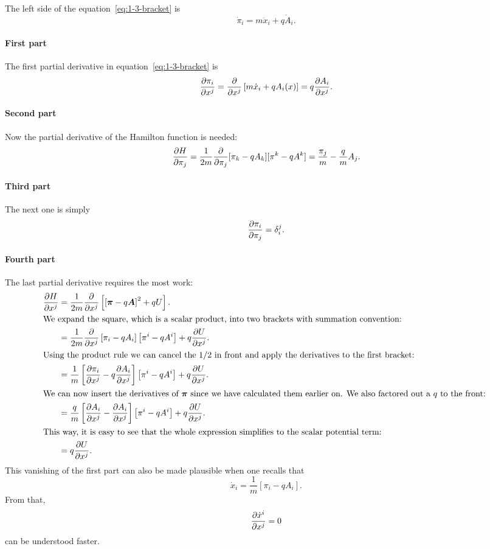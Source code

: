 \documentclass[11pt, english, fleqn, DIV=15, headinclude, BCOR=1cm]{scrartcl}
\begin{document}
The left side of the equation~\eqref{eq:1-3-bracket} is
\[
    \dot \pi_i = m \ddot x_i + q \dot A_i.
\]

\paragraph{First part}

The first partial derivative in equation~\eqref{eq:1-3-bracket} is
\[
    \frac{\partial {\pi_i}}{\partial {x^j}} = \frac{\partial {}}{\partial {x^j}} \left[ m \dot x_i + q A_i(x) \right] = q \frac{\partial {A_i}}{\partial {x^j}}.
\]

\paragraph{Second part}

Now the partial derivative of the Hamilton function is needed:
\[
    \frac{\partial {H}}{\partial {\pi_j}}
    = \frac 1{2m} \frac{\partial {}}{\partial {\pi_j}} [\pi_k - q A_k][\pi^k - q A^k]
    = \frac{\pi_j}m - \frac qm A_j.
\]

\paragraph{Third part}

The next one is simply
\[
    \frac{\partial {\pi_i}}{\partial {\pi_j}} = \delta_i^j.
\]

\paragraph{Fourth part}

The last partial derivative requires the most work:
\begin{align*}
    \pd{H}{x^j}
    &= \frac{1}{2m} \pd{}{x^j} \sbr{ \sbr{\vec \pi - q \vec A}^2 + q U}. \\
    \intertext{%
        We expand the square, which is a scalar product, into two brackets with
        summation convention:
    }
    &= \frac{1}{2m} \pd{}{x^j} \sbr{\pi_i - q A_i} \sbr{\pi^i - q A^i} + q
    \pd{U}{x^j}. \\
    \intertext{%
        Using the product rule we can cancel the $1/2$ in front and apply the
        derivatives to the first bracket:
    }
    &= \frac{1}{m} \sbr{\pd{\pi_i}{x^j} - q \pd{A_i}{x^j}} \sbr{\pi^i - q A^i} + q
    \pd{U}{x^j}. \\
    \intertext{%
        We can now insert the derivatives of $\vec \pi$ since we have
        calculated them earlier on. We also factored out a $q$ to the front:
    }
    &= \frac{q}{m} \sbr{\pd{A_i}{x^j} - \pd{A_i}{x^j}} \sbr{\pi^i - q A^i} + q
    \pd{U}{x^j}. \\
    \intertext{%
        This way, it is easy to see that the whole expression simplifies to the
        scalar potential term:
    }
    &= q \pd{U}{x^j}.
\end{align*}
This vanishing of the first part can also be made plausible when one recalls
that
\[
    \dot x_i = \frac 1m [\pi_i - q A_i].
\]
From that,
\[
    \frac{\partial {\dot x^i}}{\partial {x^j}} = 0
\]
can be understood faster.
\end{document}
